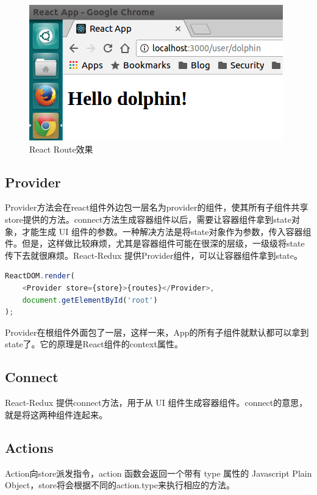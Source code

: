 \documentclass[letter]{book}
\begin{document}
\begin{figure}[htbp]
	\centering
	\includegraphics[scale=0.6]{firstroute.png}
	\caption{React Route效果}
	\label{fig:firstroute}
\end{figure}

\subsection{Provider}

Provider方法会在react组件外边包一层名为provider的组件，使其所有子组件共享store提供的方法。connect方法生成容器组件以后，需要让容器组件拿到state对象，才能生成 UI 组件的参数。一种解决方法是将state对象作为参数，传入容器组件。但是，这样做比较麻烦，尤其是容器组件可能在很深的层级，一级级将state传下去就很麻烦。React-Redux 提供Provider组件，可以让容器组件拿到state。

\begin{lstlisting}[language=Javascript]
ReactDOM.render(
	<Provider store={store}>{routes}</Provider>,
	document.getElementById('root')
);
\end{lstlisting}

Provider在根组件外面包了一层，这样一来，App的所有子组件就默认都可以拿到state了。它的原理是React组件的context属性。

\subsection{Connect}

React-Redux 提供connect方法，用于从 UI 组件生成容器组件。connect的意思，就是将这两种组件连起来。

\subsection{Actions}

Action向store派发指令，action 函数会返回一个带有 type 属性的 Javascript Plain Object，store将会根据不同的action.type来执行相应的方法。
\end{document}
